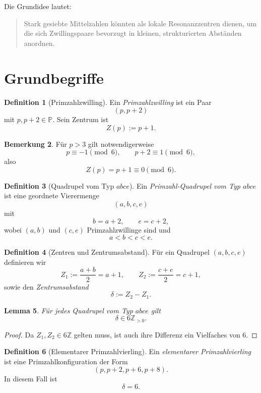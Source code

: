 \documentclass[11pt,a4paper]{article}
\theoremstyle{definition}
\newtheorem{definition}{Definition}[section]
\newtheorem{remark}[definition]{Bemerkung}
\theoremstyle{plain}
\newtheorem{lemma}[definition]{Lemma}
\theoremstyle{remark}
\newcommand{\Z}{\mathbb{Z}}
\newcommand{\pp}{\mathbb{P}}
\begin{document}
	Die Grundidee lautet:
	\begin{quote}
		Stark gesiebte Mittelzahlen könnten als lokale Resonanzzentren dienen, um die sich Zwillingspaare bevorzugt in kleinen, strukturierten Abständen anordnen.
	\end{quote}
	
	\section{Grundbegriffe}
	
	\begin{definition}[Primzahlzwilling]
		Ein \emph{Primzahlzwilling} ist ein Paar
		\[
		(p,p+2)
		\]
		mit $p,p+2\in\pp$.
		Sein Zentrum ist
		\[
		Z(p):=p+1.
		\]
	\end{definition}
	
	\begin{remark}
		Für $p>3$ gilt notwendigerweise
		\[
		p\equiv -1 \pmod 6,\qquad p+2\equiv 1\pmod 6,
		\]
		also
		\[
		Z(p)=p+1\equiv 0\pmod 6.
		\]
	\end{remark}
	
	\begin{definition}[Quadrupel vom Typ $abce$]
		Ein \emph{Primzahl-Quadrupel vom Typ $abce$} ist eine geordnete Vierermenge
		\[
		(a,b,c,e)
		\]
		mit
		\[
		b=a+2,\qquad e=c+2,
		\]
		wobei $(a,b)$ und $(c,e)$ Primzahlzwillinge sind und
		\[
		a<b<c<e.
		\]
	\end{definition}
	
	\begin{definition}[Zentren und Zentrumsabstand]
		Für ein Quadrupel $(a,b,c,e)$ definieren wir
		\[
		Z_1:=\frac{a+b}{2}=a+1,\qquad Z_2:=\frac{c+e}{2}=c+1,
		\]
		sowie den \emph{Zentrumsabstand}
		\[
		\delta:=Z_2-Z_1.
		\]
	\end{definition}
	
	\begin{lemma}
		Für jedes Quadrupel vom Typ $abce$ gilt
		\[
		\delta\in 6\Z_{>0}.
		\]
	\end{lemma}
	
	\begin{proof}
		Da $Z_1,Z_2\in 6\Z$ gelten muss, ist auch ihre Differenz ein Vielfaches von $6$.
	\end{proof}
	
	\begin{definition}[Elementarer Primzahlvierling]
		Ein \emph{elementarer Primzahlvierling} ist eine Primzahlkonfiguration der Form
		\[
		(p,p+2,p+6,p+8).
		\]
		In diesem Fall ist
		\[
		\delta=6.
		\]
	\end{definition}
	
\end{document}
